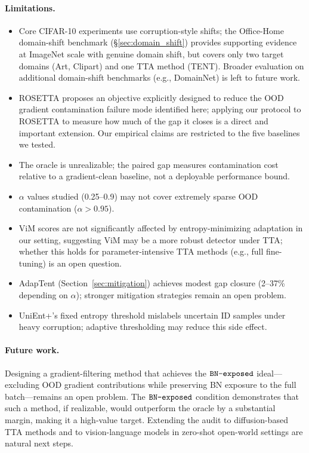 \paragraph{Limitations.}
\begin{itemize}[leftmargin=*,topsep=2pt,itemsep=1pt]
  \item Core CIFAR-10 experiments use corruption-style shifts; the Office-Home domain-shift benchmark (\S\ref{sec:domain_shift}) provides supporting evidence at ImageNet scale with genuine domain shift, but covers only two target domains (Art, Clipart) and one TTA method (TENT). Broader evaluation on additional domain-shift benchmarks (e.g., DomainNet) is left to future work.
  \item ROSETTA \citep{rosetta} proposes an objective explicitly designed to reduce the OOD gradient contamination failure mode identified here; applying our protocol to ROSETTA to measure how much of the gap it closes is a direct and important extension. Our empirical claims are restricted to the five baselines we tested.
  \item The \idonly{} oracle is unrealizable; the paired gap measures contamination cost relative to a gradient-clean baseline, not a deployable performance bound.
  \item $\alpha$ values studied (0.25--0.9) may not cover extremely sparse OOD contamination ($\alpha > 0.95$).
  \item ViM scores are not significantly affected by entropy-minimizing adaptation in our setting, suggesting ViM may be a more robust detector under TTA; whether this holds for parameter-intensive TTA methods (e.g., full fine-tuning) is an open question.
  \item AdapTent (Section~\ref{sec:mitigation}) achieves modest gap closure (2--37\% depending on $\alpha$); stronger mitigation strategies remain an open problem.
  \item UniEnt+'s fixed entropy threshold mislabels uncertain ID samples under heavy corruption; adaptive thresholding may reduce this side effect.
\end{itemize}

\paragraph{Future work.}
Designing a gradient-filtering method that achieves the $\texttt{BN-exposed}$ ideal---excluding OOD gradient contributions while preserving BN exposure to the full batch---remains an open problem.
The $\texttt{BN-exposed}$ condition demonstrates that such a method, if realizable, would outperform the oracle by a substantial margin, making it a high-value target.
Extending the audit to diffusion-based TTA methods and to vision-language models in zero-shot open-world settings are natural next steps.
